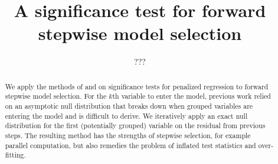 \documentclass{imsart}
\begin{document}
\begin{frontmatter}

\title{A significance test for forward stepwise model selection}


\author{ 
\and {} 
\and ???}


\address{Department of Statistics\\  Stanford University\\ Sequoia
Hall \\390 Serra Mall\\ Stanford, CA 94305, U.S.A.\\ }


\begin{abstract}
  We apply the methods of \cite{tests:adaptive} and
  \cite{significance:lasso} on significance tests for penalized
  regression to forward stepwise model selection. For the $k$th
  variable to enter the model, previous work relied on an asymptotic
  null distribution that breaks down when grouped variables are
  entering the model and is difficult to derive. We iteratively apply
  an exact null distribution for the first (potentially grouped)
  variable on the residual from previous steps. The resulting method
  has the strengths of stepwise selection, for example parallel
  computation, but also remedies the problem of inflated test
  statistics and over-fitting.
\end{abstract}

\begin{keyword}[class=AMS]
\end{keyword}

\begin{keyword}
\end{keyword}

\end{frontmatter}
\end{document}
